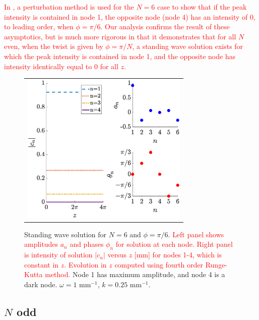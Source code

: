 \documentclass[reprint, amsmath,amssymb,aps,pra]{revtex4-2}
\renewcommand{\revised}[1]{ \textcolor{red}{#1} }
\begin{document}
\revised{In \cite{castro2016}, a perturbation method is used for the $N=6$ case to show that if the peak intensity is contained in node 1, the opposite node (node 4) has an intensity of 0, to leading order, when $\phi=\pi/6$. Our analysis confirms the result of these asymptotics, but is much more rigorous in that it demonstrates that for all $N$ even, when the twist is given by $\phi = \pi/N$, a standing wave solution exists for which the peak intensity is contained in node 1, and the opposite node has intensity identically equal to 0 for all $z$. }

\begin{figure}
\begin{center}
\begin{tabular}{c}
\includegraphics[width=8cm]{evenhole6.eps}
\end{tabular}
\end{center}
\caption{Standing wave solution for $N = 6$ and $\phi = \pi/6$. \revised{Left panel shows amplitudes $a_n$ and phases $\phi_n$ for solution at each node. Right panel is intensity of solution $|c_n|$ versus $z$ [mm] for nodes 1-4, which is constant in $z$. Evolution in $z$ computed using fourth order Runge-Kutta method.} Node 1 has maximum amplitude, and node 4 is a dark node. $\omega = 1 \text{ mm}^{-1}$, $k = 0.25 \text{ mm}^{-1}$.}
\label{fig:evenhole6}
\end{figure}

\subsection{\texorpdfstring{$N$}{N} odd}\label{sec:Nodd}
\end{document}
